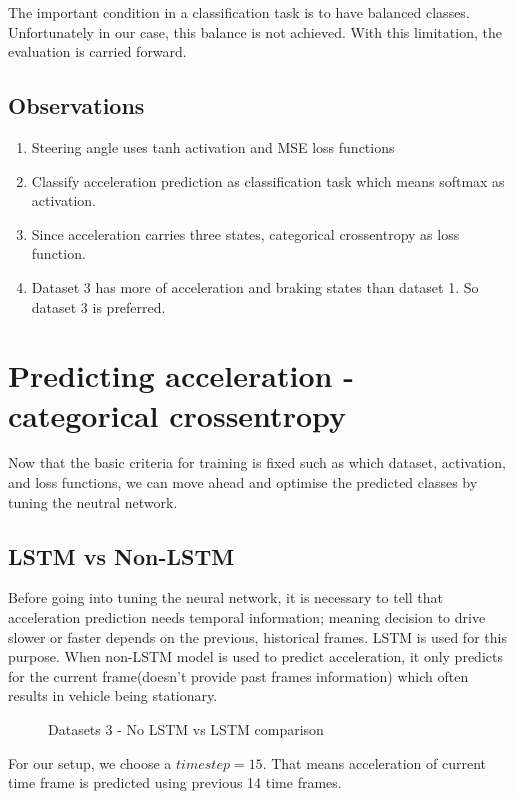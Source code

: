 The important condition in a classification task is to have balanced classes.
Unfortunately in our case, this balance is not achieved. With this limitation, the
evaluation is carried forward.

\subsection{Observations}
\begin{enumerate}
    \item Steering angle uses tanh activation and MSE loss functions
    \item Classify acceleration prediction as classification task which means softmax as
        activation.
    \item Since acceleration carries three states, categorical crossentropy as loss
        function.
    \item Dataset 3 has more of acceleration and braking states than dataset 1. So dataset
        3 is preferred.
\end{enumerate}
\section{Predicting acceleration - categorical crossentropy}
\label{chapter5sec:cce}
Now that the basic criteria for training is fixed such as which dataset, activation, and
loss functions, we can move ahead and optimise the predicted classes by tuning the
neutral network.

\subsection*{LSTM vs Non-LSTM}
Before going into tuning the neural network, it is necessary to tell that acceleration
prediction needs temporal information; meaning decision to drive slower or faster depends
on the previous, historical frames. LSTM is used for this purpose. When non-LSTM model is used
to predict acceleration, it only predicts for the current frame(doesn't provide past
frames information) which often results in vehicle being stationary.
\begin{figure}[!ht]
    \centering
    \def\svgwidth{0.8\textwidth}
    
    \caption{Datasets 3 - No LSTM vs LSTM comparison}
    \label{fig:ds3nolstmvslstm}
\end{figure}
For our setup, we choose a $timestep = 15$. That means acceleration of current time frame
is predicted using previous 14 time frames.
